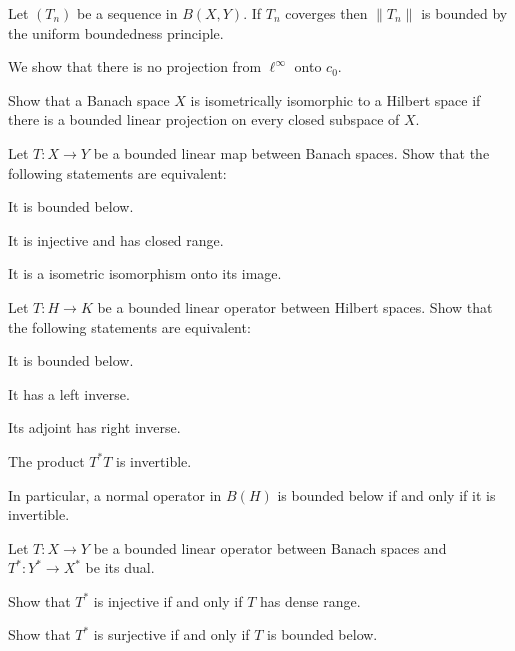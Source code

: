 \documentclass[a4paper,12pt]{report}
\begin{document}
\begin{prb}
Let $(T_n)$ be a sequence in $B(X,Y)$.
If $T_n$ coverges then $\|T_n\|$ is bounded by the uniform boundedness principle.
\end{prb}





\begin{prb}
We show that there is no projection from $\ell^\infty$ onto $c_0$.
\begin{parts}
\item
Show that a Banach space $X$ is isometrically isomorphic to a Hilbert space if there is a bounded linear projection on every closed subspace of $X$.
\end{parts}
\end{prb}





\begin{prb}
Let $T:X\to Y$ be a bounded linear map between Banach spaces.
Show that the following statements are equivalent:
\begin{parts}
\item It is bounded below.
\item It is injective and has closed range.
\item It is a isometric isomorphism onto its image.
\end{parts}
\end{prb}


\begin{prb}
Let $T:H\to K$ be a bounded linear operator between Hilbert spaces.
Show that the following statements are equivalent:
\begin{parts}
\item It is bounded below.
\item It has a left inverse.
\item Its adjoint has right inverse.
\item The product $T^*T$ is invertible.
\end{parts}
In particular, a normal operator in $B(H)$ is bounded below if and only if it is invertible.
\end{prb}





\begin{prb}
Let $T:X\to Y$ be a bounded linear operator between Banach spaces and $T^*:Y^*\to X^*$ be its dual.
\begin{parts}
\item
Show that $T^*$ is injective if and only if $T$ has dense range.
\item
Show that $T^*$ is surjective if and only if $T$ is bounded below.
\end{parts}
\end{prb}
\end{document}
